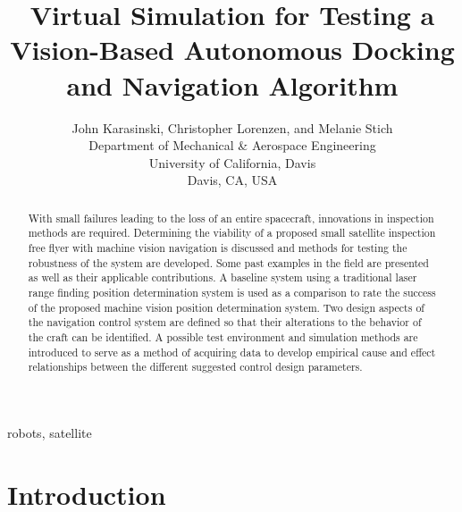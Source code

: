 \documentclass[journal, 10pt]{IEEEtran}
\begin{document}
\title{Virtual Simulation for Testing a Vision-Based Autonomous Docking and Navigation Algorithm}

\author{John Karasinski, Christopher Lorenzen, and Melanie Stich\\Department of Mechanical \& Aerospace Engineering\\University of California, Davis\\Davis, CA, USA }

\maketitle

\begin{abstract}
With small failures leading to the loss of an entire spacecraft, innovations in inspection methods are required.  Determining the viability of a proposed small satellite inspection free flyer with machine vision navigation is discussed and methods for testing the robustness of the system are developed.  Some past examples in the field are presented as well as their applicable contributions.  A baseline system using a traditional laser range finding position determination system is used as a comparison to rate the success of the proposed machine vision position determination system.  Two design aspects of the navigation control system are defined so that their alterations to the behavior of the craft can be identified.  A possible test environment and simulation methods are introduced to serve as a method of acquiring data to develop empirical cause and effect relationships between the different suggested control design parameters.
\end{abstract}

\begin{IEEEkeywords}
robots, satellite
\end{IEEEkeywords}


\section{Introduction}
\end{document}
